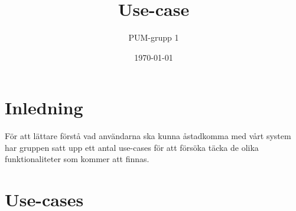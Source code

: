 

\ifpdf
\else
\fi

\title{Use-case}
\author{PUM-grupp 1}
\date{\today}



\maketitle\thispagestyle{empty}

\newpage

\section{Inledning}
För att lättare förstå vad användarna ska kunna åstadkomma med vårt system har gruppen satt upp ett antal use-cases för att försöka täcka de olika funktionaliteter som kommer att finnas.

\section{Use-cases} 
